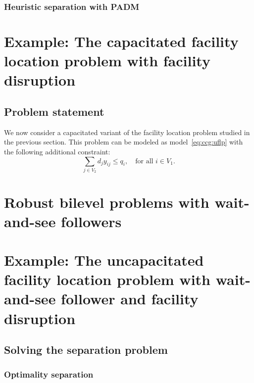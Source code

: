 
\subsubsection*{Heuristic separation with PADM}


\section[Example: The CFLP with facility disruption]{Example: The capacitated facility location problem with facility disruption}

\subsection{Problem statement}

We now consider a capacitated variant of the facility location problem studied
in the previous section. This problem can be modeled as
model~\eqref{eq:ccg:uflp} with the following additional constraint:
\begin{equation*}
    \sum_{j\in V_2} d_jy_{ij} \le q_i, \quad \text{for all } i\in V_1.
\end{equation*}

\section{Robust bilevel problems with wait-and-see followers}

\section[Example: The bilevel UFLP with facility location]{Example: The uncapacitated facility location problem with wait-and-see follower and facility disruption}

\subsection{Solving the separation problem}

\subsubsection{Optimality separation}
